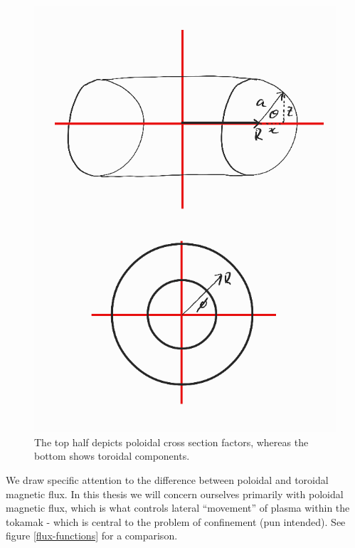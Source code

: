 \begin{figure}[h!]
    \centering
    \includegraphics[scale=0.5]{imgs/c1/dimensions.png}
    \caption{The top half depicts poloidal cross section factors, whereas the bottom shows toroidal components. }
    \label{dimensions}
\end{figure}

We draw specific attention to the difference between poloidal and toroidal magnetic flux. In this thesis we will concern 
ourselves primarily with poloidal magnetic flux, which is what controls lateral ``movement'' of plasma within the tokamak - 
which is central to the problem of confinement (pun intended). See figure \ref{flux-functions} for a comparison.

